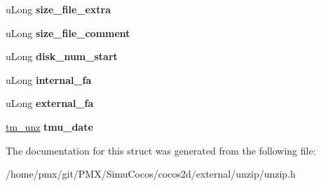 \begin{DoxyCompactItemize}
u\+Long {\bfseries size\+\_\+file\+\_\+extra}
\item 
\mbox{\label{structcocos2d_1_1unz__file__info__s_af4ab4d461bb2d0244a54579263a52936}} 
u\+Long {\bfseries size\+\_\+file\+\_\+comment}
\item 
\mbox{\label{structcocos2d_1_1unz__file__info__s_afe1c06a11eca9735b338e2ecdbeccbf5}} 
u\+Long {\bfseries disk\+\_\+num\+\_\+start}
\item 
\mbox{\label{structcocos2d_1_1unz__file__info__s_ac7d3f1bbd00b358a39d5eb48b124a2c9}} 
u\+Long {\bfseries internal\+\_\+fa}
\item 
\mbox{\label{structcocos2d_1_1unz__file__info__s_a3244c6c1ceef50a4cd6cae4b3d7c1867}} 
u\+Long {\bfseries external\+\_\+fa}
\item 
\mbox{\label{structcocos2d_1_1unz__file__info__s_a991d78bc9887c909f050622087104289}} 
\hyperlink{structcocos2d_1_1tm__unz__s}{tm\+\_\+unz} {\bfseries tmu\+\_\+date}
\end{DoxyCompactItemize}


The documentation for this struct was generated from the following file\+:\begin{DoxyCompactItemize}
\item 
/home/pmx/git/\+P\+M\+X/\+Simu\+Cocos/cocos2d/external/unzip/unzip.\+h\end{DoxyCompactItemize}

